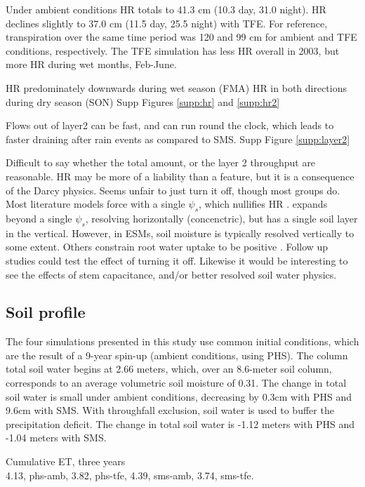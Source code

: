 \documentclass[draft,linenumbers]{agujournal}
\begin{document}
Under ambient conditions HR totals to 41.3 cm (10.3 day, 31.0 night). 
HR declines slightly to 37.0 cm (11.5 day, 25.5 night) with TFE.
For reference, transpiration over the same time period was 120 and 99 cm for ambient and TFE conditions, respectively.
The TFE simulation has less HR overall in 2003, but more HR during wet months, Feb-June.



HR predominately downwards during wet season (FMA)
HR in both directions during dry season (SON)
Supp Figures \ref{supp:hr} and \ref{supp:hr2}

Flows out of layer2 can be fast, and can run round the clock, which leads to faster draining after rain events as compared to SMS.
Supp Figure \ref{supp:layer2}

Difficult to say whether the total amount, or the layer 2 throughput are reasonable.
HR may be more of a liability than a feature, but it is a consequence of the Darcy physics.
Seems unfair to just turn it off, though most groups do.
Most literature models force with a single $\psi_s$, which nullifies HR \citep{fisher2007,bonan2014,sperry2017}.
\cite{christoffersen2016} expands beyond a single $\psi_s$, resolving horizontally (concenctric), but has a single soil layer in the vertical.
However, in ESMs, soil moisture is typically resolved vertically to some extent.
Others constrain root water uptake to be positive \citep{xu2016}.
Follow up studies could test the effect of turning it off.
Likewise it would be interesting to see the effects of stem capacitance, and/or better resolved soil water physics.


\subsection{Soil profile}

The four simulations presented in this study use common initial conditions, which are the result of a 9-year spin-up (ambient conditions, using PHS).
The column total soil water begins at 2.66 meters, which, over an 8.6-meter soil column, corresponds to an average volumetric soil moisture of 0.31.
The change in total soil water is small under ambient conditions, decreasing by 0.3cm with PHS and 9.6cm with SMS.
With throughfall exclusion, soil water is used to buffer the precipitation deficit.
The change in total soil water is -1.12 meters with PHS and -1.04 meters with SMS.



Cumulative ET, three years \\
    4.13, phs-amb,
    3.82, phs-tfe,
    4.39, sms-amb,
    3.74, sms-tfe.
\end{document}
